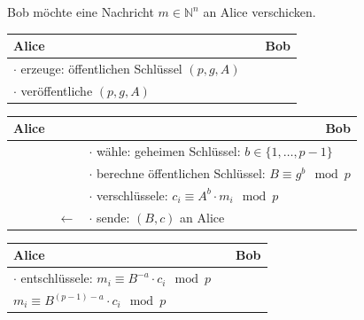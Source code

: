 \documentclass[utf8]{beamer}
\newcommand{\N}{\mathbb{N}}
\begin{document}
\begin{frame}{\insertsubsectionhead}
  Bob möchte eine Nachricht $m \in \N^n$ an Alice verschicken.

  \pause

  \begin{center}
    \begin{tabularx}{\textwidth}{Xcl}
      \textbf{Alice} & & \textbf{Bob}\\\midrule
      $\cdot$ erzeuge: öffentlichen Schlüssel $(p, g, A)$\\
      $\cdot$ veröffentliche $(p, g, A)$
    \end{tabularx}
  \end{center}

  \pause

  \begin{center}
    \begin{tabularx}{\textwidth}{lcX}
      \textbf{Alice} &  & \multicolumn{1}{r}{\textbf{Bob}}\\\midrule
      & & $\cdot$ wähle: geheimen Schlüssel: $b\in \{ 1 ,\ldots , p - 1 \}$\\
      & & $\cdot$ berechne öffentlichen Schlüssel: $B \equiv g^b \mod p$\\
      & & $\cdot$ verschlüssele: $c_i \equiv A^b \cdot m_i \mod p$\\
      & $\leftarrow$ & $\cdot$ sende: $(B, c)$ an Alice
    \end{tabularx}
  \end{center}

  \pause

  \begin{center}
    \begin{tabularx}{\textwidth}{Xcl}
      \textbf{Alice} &  & \textbf{Bob}\\\midrule
      $\cdot$ entschlüssele: $m_i \equiv B^{-a} \cdot c_i \mod p$\\
      $m_i \equiv B^{(p-1)-a} \cdot c_i \mod p$
    \end{tabularx}
  \end{center}
\end{frame}
\end{document}

